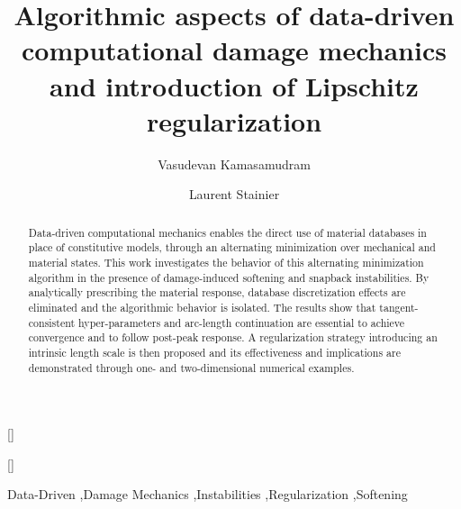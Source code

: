 \documentclass[10pt,review]{cas-sc}
\begin{document}
\let\WriteBookmarks\relax
\def\floatpagepagefraction{1}
\def\textpagefraction{.001}

\title [mode = title]{Algorithmic aspects of data-driven computational damage mechanics and introduction of Lipschitz regularization}                      
%
%


\author[2,1]{Vasudevan Kamasamudram}[]
\fnmark[1]



\author[1]{Laurent Stainier}[]




\begin{abstract}
Data-driven computational mechanics enables the direct use of material databases in place of constitutive models, through an alternating minimization over mechanical and material states. This work investigates the behavior of this alternating minimization algorithm in the presence of damage-induced softening and snapback instabilities. By analytically prescribing the material response, database discretization effects are eliminated and the algorithmic behavior is isolated. The results show that tangent-consistent hyper-parameters and arc-length continuation are essential to achieve convergence and to follow post-peak response. A regularization strategy introducing an intrinsic length scale is then proposed and its effectiveness and implications are demonstrated through one- and two-dimensional numerical examples.
\end{abstract}

\begin{keywords}
	Data-Driven \sep Damage Mechanics \sep Instabilities \sep Regularization \sep Softening
\end{keywords}
\end{document}
